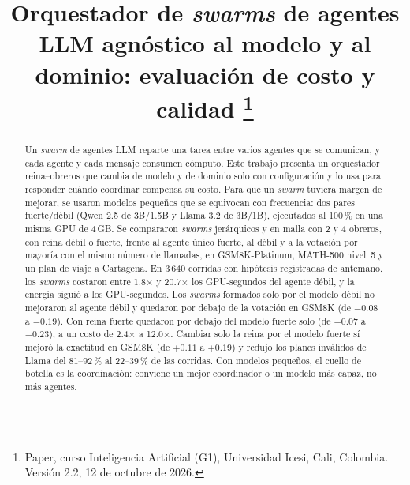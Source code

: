 \documentclass[conference]{IEEEtran}
\newcommand{\x}{\ensuremath{\times}}
\begin{document}
\title{Orquestador de \textit{swarms} de agentes LLM agnóstico al modelo y al dominio: evaluación de costo y calidad
\thanks{Paper, curso Inteligencia Artificial (G1), Universidad Icesi, Cali, Colombia. Versión 2.2, 12 de octubre de 2026.}}

\author{
\and
{}
}

\maketitle

\begin{abstract}
Un \textit{swarm} de agentes LLM reparte una tarea entre varios agentes que se comunican, y cada agente y cada mensaje consumen cómputo. Este trabajo presenta un orquestador reina--obreros que cambia de modelo y de dominio solo con configuración y lo usa para responder cuándo coordinar compensa su costo. Para que un \textit{swarm} tuviera margen de mejorar, se usaron modelos pequeños que se equivocan con frecuencia: dos pares fuerte/débil (Qwen 2.5 de 3B/1.5B y Llama 3.2 de 3B/1B), ejecutados al 100\,\% en una misma GPU de 4\,GB. Se compararon \textit{swarms} jerárquicos y en malla con 2 y 4 obreros, con reina débil o fuerte, frente al agente único fuerte, al débil y a la votación por mayoría con el mismo número de llamadas, en GSM8K-Platinum, MATH-500 nivel~5 y un plan de viaje a Cartagena. En 3\,640 corridas con hipótesis registradas de antemano, los \textit{swarms} costaron entre 1.8\x{} y 20.7\x{} los GPU-segundos del agente débil, y la energía siguió a los GPU-segundos. Los \textit{swarms} formados solo por el modelo débil no mejoraron al agente débil y quedaron por debajo de la votación en GSM8K (de $-0.08$ a $-0.19$). Con reina fuerte quedaron por debajo del modelo fuerte solo (de $-0.07$ a $-0.23$), a un costo de 2.4\x{} a 12.0\x{}. Cambiar solo la reina por el modelo fuerte sí mejoró la exactitud en GSM8K (de $+0.11$ a $+0.19$) y redujo los planes inválidos de Llama del 81--92\,\% al 22--39\,\% de las corridas. Con modelos pequeños, el cuello de botella es la coordinación: conviene un mejor coordinador o un modelo más capaz, no más agentes.
\end{abstract}
\end{document}
